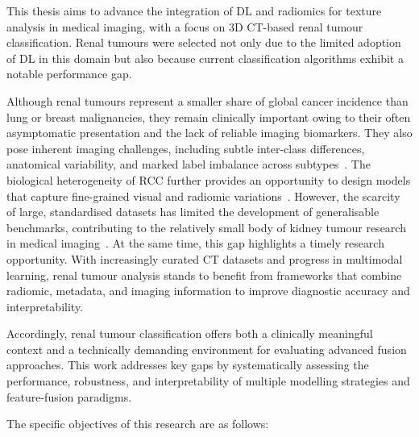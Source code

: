\documentclass[final,british,a4paper,12pt]{phdthesis}
\begin{document}
This thesis aims to advance the integration of DL and radiomics for texture analysis in medical imaging, with a focus on 3D CT-based renal tumour classification. Renal tumours were selected not only due to the limited adoption of DL in this domain but also because current classification algorithms exhibit a notable performance gap.

Although renal tumours represent a smaller share of global cancer incidence than lung or breast malignancies, they remain clinically important owing to their often asymptomatic presentation and the lack of reliable imaging biomarkers. They also pose inherent imaging challenges, including subtle inter-class differences, anatomical variability, and marked label imbalance across subtypes~\cite{khan2025}. The biological heterogeneity of RCC further provides an opportunity to design models that capture fine-grained visual and radiomic variations~\cite{bang2025,uhlig2024}. However, the scarcity of large, standardised datasets has limited the development of generalisable benchmarks, contributing to the relatively small body of kidney tumour research in medical imaging~\cite{sheikhy2025}. At the same time, this gap highlights a timely research opportunity. With increasingly curated CT datasets and progress in multimodal learning, renal tumour analysis stands to benefit from frameworks that combine radiomic, metadata, and imaging information to improve diagnostic accuracy and interpretability.

Accordingly, renal tumour classification offers both a clinically meaningful context and a technically demanding environment for evaluating advanced fusion approaches. This work addresses key gaps by systematically assessing the performance, robustness, and interpretability of multiple modelling strategies and feature-fusion paradigms.





The specific objectives of this research are as follows:
\end{document}
